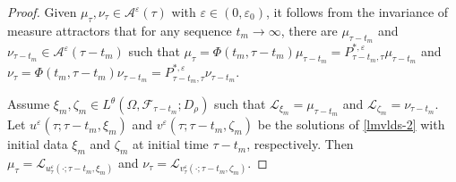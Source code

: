 \documentclass[11pt]{article}
\numberwithin{equation}{section}
\theoremstyle{plain}
\begin{document}
\begin{proof}
 Given $\mu_\tau, \nu_\tau \in \mathcal{A}^\varepsilon(\tau)$ with $\varepsilon \in (0, \varepsilon_0)$,
 it follows from the invariance of measure attractors that
 for any sequence $t_m \to \infty$,
 there are $\mu_{\tau-t_m}$ and $\nu_{\tau-t_m} \in \mathcal{A}^\varepsilon(\tau-t_m)$
 such that
     $\mu_\tau = \Phi (t_m, \tau-t_m) \mu_{\tau-t_m} 
                       = P_{\tau-t_m, \tau}^{\ast, \varepsilon} \mu_{\tau-t_m}$
 and
     $\nu_\tau = \Phi (t_m, \tau-t_m) \nu_{\tau-t_m} 
                      = P_{\tau-t_m, \tau}^{\ast,\varepsilon} \nu_{\tau-t_m}.$

 Assume $\xi_{m}, \zeta_{m} \in L^{\theta}(\Omega, \mathcal{F}_{\tau-t_m}; D_\rho)$
 such that $\mathcal{L}_{\xi_m} = \mu_{\tau-t_m}$ and $\mathcal{L}_{\zeta_m} = \nu_{\tau-t_m}$.
 Let $u^{\varepsilon}(\tau; \tau-t_m, \xi_m)$ and $v^{\varepsilon}(\tau; \tau-t_m, \zeta_m)$
 be 
 the solutions of \eqref{lmvlds-2}
 with initial data $\xi_m$ and $\zeta_m$ at initial time $\tau-t_m$, respectively.
 Then
     $\mu_\tau = \mathcal{L}_{u^\varepsilon_\tau(\cdot; \tau-t_m, \xi_m) }$
 and
     $\nu_\tau = \mathcal{L}_{v^\varepsilon_\tau(\cdot; \tau-t_m, \zeta_m) }$.


\end{proof}
\end{document}
